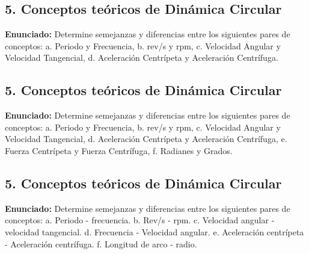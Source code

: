 \documentclass[12pt, letterpaper]{article}
\begin{document}
	
\subsection*{5. Conceptos teóricos de Dinámica Circular}
\noindent \textbf{Enunciado:} Determine semejanzas y diferencias entre los siguientes pares de conceptos: a. Periodo y Frecuencia, b. rev/s y rpm, c. Velocidad Angular y Velocidad Tangencial, d. Aceleración Centrípeta y Aceleración Centrífuga.

\subsection*{5. Conceptos teóricos de Dinámica Circular}
\noindent \textbf{Enunciado:} Determine semejanzas y diferencias entre los siguientes pares de conceptos: a. Periodo y Frecuencia, b. rev/s y rpm, c. Velocidad Angular y Velocidad Tangencial, d. Aceleración Centrípeta y Aceleración Centrífuga, e. Fuerza Centrípeta y Fuerza Centrífuga, f. Radianes y Grados.

\subsection*{5. Conceptos teóricos de Dinámica Circular}
\noindent \textbf{Enunciado:} Determine semejanzas y diferencias entre los siguientes pares de conceptos: a. Periodo - frecuencia. b. Rev/s - rpm. c. Velocidad angular - velocidad tangencial. d. Frecuencia - Velocidad angular. e. Aceleración centrípeta - Aceleración centrífuga. f. Longitud de arco - radio.
\end{document}
